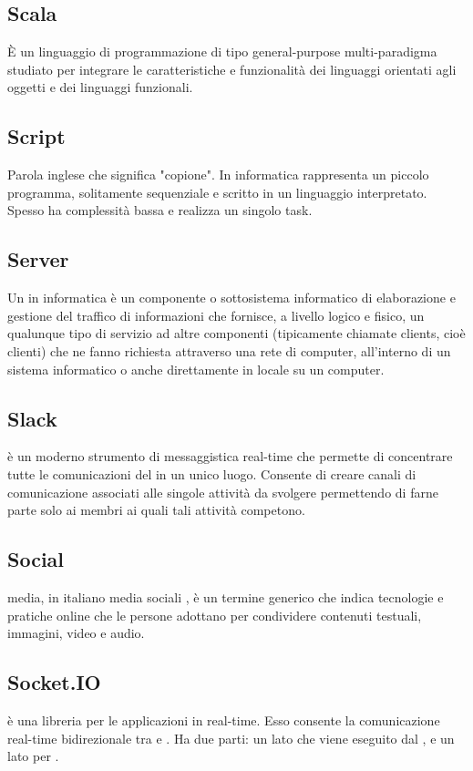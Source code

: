 \subsection*{Scala}
È un linguaggio di programmazione di tipo general-purpose multi-paradigma studiato per integrare le caratteristiche e funzionalità dei linguaggi orientati agli oggetti e dei linguaggi funzionali.

\subsection*{Script}
Parola inglese che significa "copione". In informatica rappresenta un piccolo
programma, solitamente sequenziale e scritto in un linguaggio interpretato.
Spesso ha complessità bassa e realizza un singolo task.

\subsection*{Server}
Un  in informatica è un componente o sottosistema informatico di elaborazione e gestione del traffico di informazioni che fornisce, a livello logico e fisico, un qualunque tipo di servizio ad altre componenti (tipicamente chiamate clients, cioè clienti) che ne fanno richiesta attraverso una rete di computer, all'interno di un sistema informatico o anche direttamente in locale su un computer.

\subsection*{Slack}
 è un moderno strumento di messaggistica real-time che permette di concentrare tutte le comunicazioni del  in un unico luogo.
Consente di creare canali di comunicazione associati alle singole attività da svolgere permettendo di farne parte solo ai membri ai quali tali attività competono.

\subsection*{Social}
 media, in italiano media sociali , è un termine generico che indica tecnologie e pratiche online che le persone adottano per condividere contenuti testuali, immagini, video e audio.

\subsection*{Socket.IO}
 è una libreria  per le applicazioni  in real-time. Esso consente la comunicazione real-time bidirezionale tra  e  . Ha due parti: un lato  che viene eseguito dal  , e un lato  per .

